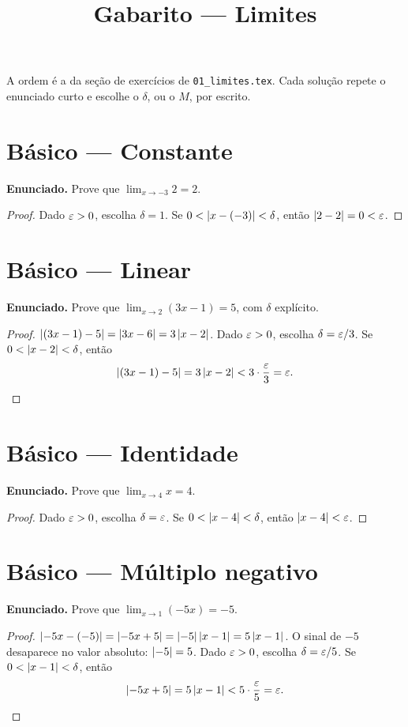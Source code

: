 \documentclass[11pt,a4paper]{article}
\title{Gabarito --- Limites}
\author{}
\date{}
\begin{document}
\maketitle
\tableofcontents

A ordem \'e a da se\c{c}\~ao de exerc\'icios de \texttt{01\_limites.tex}. Cada solu\c{c}\~ao repete o enunciado curto e escolhe o $\delta$, ou o $M$, por escrito.

\section{B\'asico --- Constante}

\textbf{Enunciado.} Prove que $\lim_{x\to -3}2=2$.

\begin{proof}
Dado $\varepsilon>0$, escolha $\delta=1$. Se $0<\left\lvert x-(-3) \right\rvert<\delta$, ent\~ao $\left\lvert 2-2 \right\rvert=0<\varepsilon$.
\end{proof}

\section{B\'asico --- Linear}

\textbf{Enunciado.} Prove que $\lim_{x\to 2}(3x-1)=5$, com $\delta$ expl\'icito.

\begin{proof}
$\left\lvert (3x-1)-5 \right\rvert=\left\lvert 3x-6 \right\rvert=3\left\lvert x-2 \right\rvert$. Dado $\varepsilon>0$, escolha $\delta=\varepsilon/3$. Se $0<\left\lvert x-2 \right\rvert<\delta$, ent\~ao
\[
\left\lvert (3x-1)-5 \right\rvert=3\left\lvert x-2 \right\rvert<3\cdot\frac{\varepsilon}{3}=\varepsilon.
\]
\end{proof}

\section{B\'asico --- Identidade}

\textbf{Enunciado.} Prove que $\lim_{x\to 4}x=4$.

\begin{proof}
Dado $\varepsilon>0$, escolha $\delta=\varepsilon$. Se $0<\left\lvert x-4 \right\rvert<\delta$, ent\~ao $\left\lvert x-4 \right\rvert<\varepsilon$.
\end{proof}

\section{B\'asico --- M\'ultiplo negativo}

\textbf{Enunciado.} Prove que $\lim_{x\to 1}(-5x)=-5$.

\begin{proof}
$\left\lvert -5x-(-5) \right\rvert=\left\lvert -5x+5 \right\rvert=\left\lvert -5 \right\rvert\left\lvert x-1 \right\rvert=5\left\lvert x-1 \right\rvert$. O sinal de $-5$ desaparece no valor absoluto: $\left\lvert -5 \right\rvert=5$. Dado $\varepsilon>0$, escolha $\delta=\varepsilon/5$. Se $0<\left\lvert x-1 \right\rvert<\delta$, ent\~ao
\[
\left\lvert -5x+5 \right\rvert=5\left\lvert x-1 \right\rvert<5\cdot\frac{\varepsilon}{5}=\varepsilon.
\]
\end{proof}
\end{document}
